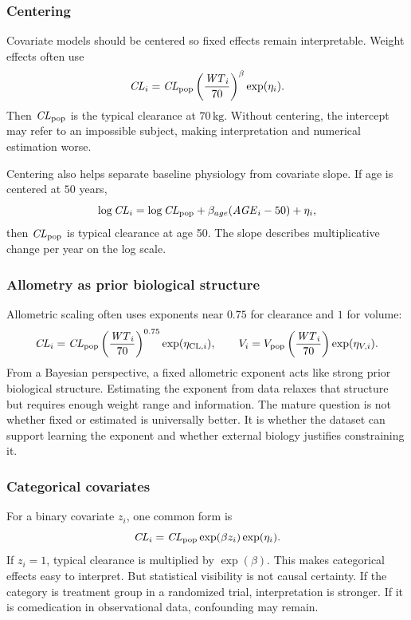 \subsubsection*{Centering}

Covariate models should be centered so fixed effects remain interpretable.  Weight effects often use
\[
  \pksym{CL}_i=\pksym{CL}_{\pop}\left(\frac{\pksym{WT}_i}{70}\right)^\beta\exp(\eta_i).
\]
Then \(\pksym{CL}_{\pop}\) is the typical clearance at \(70\,\mathrm{kg}\).  Without centering, the intercept may refer to an impossible subject, making interpretation and numerical estimation worse.

Centering also helps separate baseline physiology from covariate slope.  If age is centered at \(50\) years,
\[
  \log \pksym{CL}_i=\log \pksym{CL}_{\pop}+\beta_{age}(\pksym{AGE}_i-50)+\eta_i,
\]
then \(\pksym{CL}_{\pop}\) is typical clearance at age 50.  The slope describes multiplicative change per year on the log scale.

\subsubsection*{Allometry as prior biological structure}

Allometric scaling often uses exponents near \(0.75\) for clearance and \(1\) for volume:
\[
  \pksym{CL}_i=\pksym{CL}_{\pop}\left(\frac{\pksym{WT}_i}{70}\right)^{0.75}\exp(\eta_{\pklab{CL},i}),
  \qquad
  V_i=V_{\pop}\left(\frac{\pksym{WT}_i}{70}\right)\exp(\eta_{V,i}).
\]
From a Bayesian perspective, a fixed allometric exponent acts like strong prior biological structure.  Estimating the exponent from data relaxes that structure but requires enough weight range and information.  The mature question is not whether fixed or estimated is universally better.  It is whether the dataset can support learning the exponent and whether external biology justifies constraining it.

\subsubsection*{Categorical covariates}

For a binary covariate \(z_i\), one common form is
\[
  \pksym{CL}_i=\pksym{CL}_{\pop}\exp(\beta z_i)\exp(\eta_i).
\]
If \(z_i=1\), typical clearance is multiplied by \(\exp(\beta)\).  This makes categorical effects easy to interpret.  But statistical visibility is not causal certainty.  If the category is treatment group in a randomized trial, interpretation is stronger.  If it is comedication in observational data, confounding may remain.

